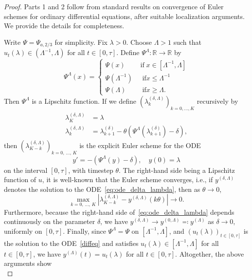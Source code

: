 \documentclass[10pt]{amsart}
\theoremstyle{definition}\newtheorem{defi}[theo]{Definition}\newtheorem{rema}[theo]{Remark}\newtheorem{exam}[theo]{Example}\newtheorem{exem}[theo]{Example}\newtheorem{nota}[theo]{Notation}
\newcommand*\R{\mathbb{R}}
\newcommand{\1} {\mathds{1}}
\renewcommand*\to{\rightarrow}
\newcommand*\tif{\ensuremath{\text{ if}}}
\begin{document}
\begin{proof}
Parts 1 and 2 follow from standard results on convergence of Euler schemes for ordinary differential equations, after suitable localization arguments. We provide the details for completeness.

Write $\Psi = \Psi_{a,2/3}$ for simplicity. Fix $\lambda > 0$. Choose $\Lambda > 1$ such that $u_t(\lambda) \in (\Lambda^{-1},\Lambda)$ for all $t\in [0,\tau]$. Define $\Psi^\Lambda:\R\to\R$ by
\[
\Psi^\Lambda(x) =
\begin{cases}
\Psi(x) & \tif\; x\in \left[\Lambda^{-1},\Lambda\right]\\
\Psi\left(\Lambda^{-1}\right) &\; \tif x\le \Lambda^{-1}\\
\Psi(\Lambda) &\; \tif x \ge \Lambda.
\end{cases}
\]
Then $\Psi^\Lambda$ is a Lipschitz function. If we define $(\lambda_k^{(\delta,\Lambda)})_{k=0,\ldots,K}$ recursively by
\begin{align*}
\lambda_K^{(\delta, \Lambda)} &= \lambda\\
\lambda_k^{(\delta, \Lambda)} &= \lambda_{k+1}^{(\delta)} - \theta\left(\Psi^\Lambda\left(\lambda_{k+1}^{(\delta)}\right) - \delta\right),
\end{align*}
then $(\lambda_{K-k}^{(\delta,\Lambda)})_{k=0,\,\ldots,\,K}$ is the explicit Euler scheme for the ODE
\begin{equation}\label{eq:ode_delta_lambda}
y' = -\left(\Psi^\Lambda(y)-\delta\right),\quad y(0) = \lambda
\end{equation}
on the interval $[0,\tau]$, with timestep $\theta$. The right-hand side being a Lipschitz function of $u$, it is well-known that the Euler scheme converges, i.e., if $y^{(\delta,\Lambda)}$ denotes the solution to the ODE~\eqref{eq:ode_delta_lambda}, then as $\theta\to 0$,
\[
\max_{k=0,\,\ldots,\,K} \left|\lambda_{K-k}^{(\delta,\Lambda)} - y^{(\delta,\Lambda)}(k\theta)\right| \to 0.
\]
Furthermore, because the right-hand side of~\eqref{eq:ode_delta_lambda} depends continuously on the parameter $\delta$, we have $y^{(\delta,\Lambda)} \to y^{(0,\Lambda)} \eqqcolon y^{(\Lambda)}$ as $\delta\to 0$, uniformly on $[0,\tau]$. Finally, since $\Psi^\Lambda = \Psi$ on $[\Lambda^{-1},\Lambda]$, and $(u_t(\lambda))_{t\in[0,\tau]}$ is the solution to the ODE~\eqref{diffeq} and satisfies $u_t(\lambda)\in [\Lambda^{-1},\Lambda]$ for all $t\in[0,\tau]$, we have $y^{(\Lambda)}(t) = u_t(\lambda)$ for all $t\in[0,\tau]$. Altogether, the above arguments show
\begin{equation}\label{eq:756}

\end{equation}
\end{proof}
\end{document}
